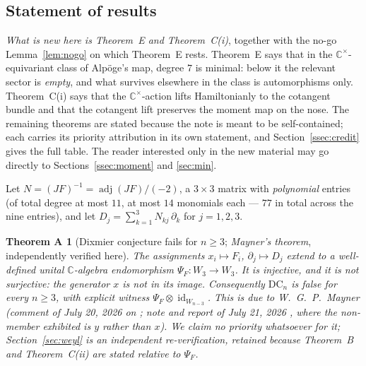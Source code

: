 \documentclass[11pt]{amsart}
\newcommand{\CC}{\mathbb{C}}
\newcommand{\Cstar}{\CC^{\times}}
\newcommand{\W}{W}
\newcommand{\id}{\operatorname{id}}
\newcommand{\DC}{\mathrm{DC}}
\theoremstyle{plain}
\newtheorem*{thmA}{Theorem A}
\theoremstyle{definition}
\theoremstyle{remark}
\begin{document}
\subsection{Statement of results}\label{ssec:results}

\emph{What is new here is Theorem~E and Theorem~C(i)}, together with the
no-go Lemma~\ref{lem:nogo} on which Theorem~E rests. Theorem~E says that
in the $\Cstar$-equivariant class of Alp\"oge's map, degree $7$ is
minimal: below it the relevant sector is \emph{empty}, and what survives
elsewhere in the class is automorphisms only. Theorem~C(i) says that the
$\Cstar$-action lifts Hamiltonianly to the cotangent bundle and that the
cotangent lift preserves the moment map on the nose. The remaining
theorems are stated because the note is meant to be self-contained; each
carries its priority attribution in its own statement, and
Section~\ref{ssec:credit} gives the full table. The reader interested only
in the new material may go directly to Sections~\ref{ssec:moment} and
\ref{sec:min}.

Let $N=(JF)^{-1}=\operatorname{adj}(JF)/(-2)$, a $3\times3$ matrix with
\emph{polynomial} entries (of total degree at most $11$, at most $14$
monomials each --- $77$ in total across the nine entries), and let
$D_{j}=\sum_{k=1}^{3}N_{kj}\,\partial_{k}$ for $j=1,2,3$.

\begin{thmA}[Dixmier conjecture fails for $n\ge3$; \emph{Mayner's theorem},
independently verified here]
The assignments $x_{i}\mapsto F_{i}$, $\partial_{j}\mapsto D_{j}$ extend to
a well-defined unital $\CC$-algebra endomorphism
$\Psi_{F}\colon\W_{3}\to\W_{3}$. It is injective, and it is not surjective:
the generator $x$ is not in its image. Consequently $\DC_{n}$ is false for
every $n\ge3$, with explicit witness $\Psi_{F}\otimes\id_{\W_{n-3}}$.
\emph{This is due to W.~G.~P.~Mayner} (comment of July 20, 2026 on
\cite{Speyer26}; note and report of July 21, 2026 \cite{Mayner26}, where
the non-member exhibited is $y$ rather than $x$). We claim no priority
whatsoever for it; Section~\ref{sec:weyl} is an independent
re-verification, retained because Theorem~B and Theorem~C(ii) are stated
relative to $\Psi_{F}$.
\end{thmA}
\end{document}
